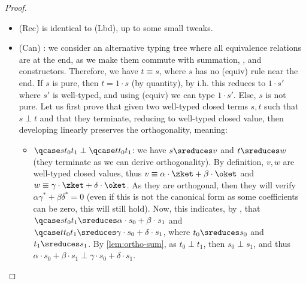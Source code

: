 \begin{proof}
\begin{itemize}
    \item (Rec) is identical to (Lbd), up to some small tweaks.

    \item (Can) : we consider an alternative typing tree where all
      equivalence relations are at the end, as we make them commute
      with summation, \textqcase{}, \textmatch{} and constructors.
      Therefore, we have $t \equiv s$, where $s$ has no (equiv) rule
      near the end.
      If $s$ is pure, then $t = 1 \cdot s$ (by quantity), by i.h.
      this reduces to
      $1 \cdot s'$ where $s'$ is well-typed, and using (equiv) we can
      type $1 \cdot s'$.
      Else, $s$ is not pure.
      Let us first prove that given two well-typed closed terms $s, t$
      such that $s \perp t$ and that they terminate, reducing to well-typed
      closed value,
      then developing linearly preserves the
      orthogonality, meaning:

      \begin{itemize}

        \item $\qcase s {t_0} {t_1} \perp \qcase t {t_0}
          {t_1}$: we have $s \sreduces v$ and $t \sreduces w$ (they
          terminate as we can derive orthogonality).
          By definition, $v, w$ are well-typed closed values,
          thus $v \equiv \alpha \cdot \zket + \beta \cdot
          \oket$ and $w \equiv \gamma \cdot \zket + \delta \cdot \oket$.
          As they are orthogonal, then they will verify $\alpha
          \gamma^* + \beta \delta^* = 0$ (even if this is not the
            canonical form as some coefficients can be zero, this will
          still hold).
          Now, this indicates, by \evalcontext, that $\qcase s
          {t_0} {t_1} \sreduces \alpha \cdot s_0 + \beta \cdot s_1$
          and $\qcase t {t_0} {t_1} \sreduces \gamma \cdot s_0 +
          \delta \cdot s_1$, where $t_0 \sreduces s_0$ and $t_1 \sreduces s_1$.
          By \autoref{lem:ortho-sum}, as $t_0 \perp t_1$, then
          $s_0 \perp s_1$, and thus
          $\alpha \cdot s_0 + \beta \cdot s_1 \perp\gamma \cdot s_0 +
          \delta \cdot s_1$.


\end{itemize}
\end{itemize}
\end{proof}
